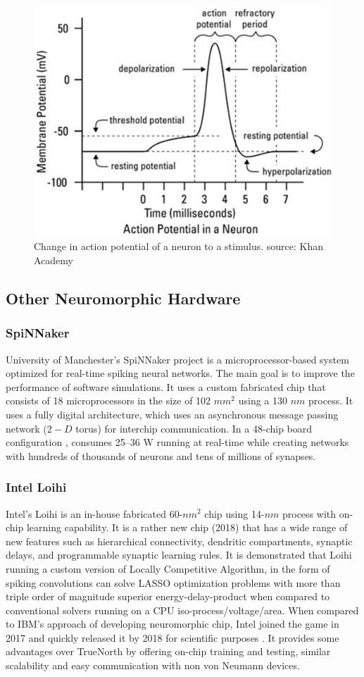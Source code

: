 \documentclass[11pt,twoside]{article}
\begin{document}
\begin{figure}
	\centering
	\includegraphics[width=0.5\linewidth]{Report-LateX-Template/fig/neuronactionpotential.png}
	\caption{Change in action potential of a neuron to a stimulus. source: Khan Academy}
	\label{fig:neuron2}
\end{figure}
 

\subsection{Other Neuromorphic Hardware}
\subsubsection{SpiNNaker}
University of Manchester's SpiNNaker project \cite{painkras2013spinnaker} is a microprocessor-based system optimized for real-time spiking neural networks. The main goal is to improve the performance of software simulations. It uses a custom fabricated chip that consists of 18 microprocessors in the size of 102 $mm^2$ using a 130 $nm$ process. It uses a fully digital architecture, which uses an asynchronous message passing network ($2-D$ torus) for interchip communication. In a 48-chip board configuration \cite{stromatias2013power}, consumes 25–36 W running at real-time while creating networks with hundreds of thousands of neurons and tens of millions of synapses.

\subsubsection{Intel Loihi}
Intel's Loihi \cite{8259423} is an in-house fabricated 60-$nm^2$ chip using 14-$nm$ process with on-chip learning capability. It is a rather new chip (2018) that has a wide range of new features such as hierarchical connectivity, dendritic compartments, synaptic delays, and programmable synaptic learning rules. It is demonstrated that Loihi running a custom version of Locally Competitive Algorithm, in the form of spiking convolutions can solve LASSO optimization problems with more than triple order of magnitude superior energy-delay-product when compared to conventional solvers running on a CPU iso-process/voltage/area. 
When compared to IBM's approach of developing neuromorphic chip, Intel joined the game in 2017 and quickly released it by 2018 for scientific purposes \cite{Tilley2017}. It provides some advantages over TrueNorth by offering on-chip training and testing, similar scalability and easy communication with non von Neumann devices. 
\end{document}
